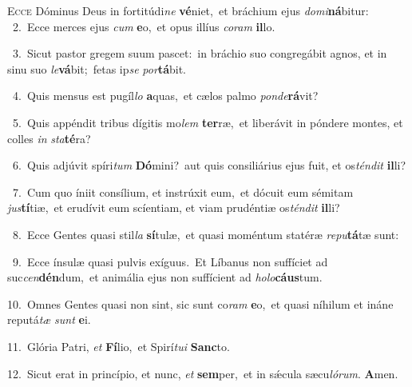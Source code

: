 \lettrine{\initial\textcolor{\initialcolor}{E}}{cce} Dóminus Deus in fortitúdi\textit{ne} \textbf{vé}\-niet,~\star et bráchium ejus \textit{do}\-\textit{mi}\textbf{ná}bitur:\\
{\numbfont\textcolor{\numbcolor}{~2.}}~Ecce merces ejus \textit{cum} \textbf{e}\-o,~\star et opus illíus \textit{co}\-\textit{ram} \textbf{il}\-lo.\par
{\numbfont\textcolor{\numbcolor}{~3.}}~Sicut pastor gregem suum pascet:~\dagger in bráchio suo congregábit agnos, et in sinu suo \textit{le}\-\textbf{vá}bit;~\star fetas ip\textit{se} \textit{por}\-\textbf{tá}bit.\par
{\numbfont\textcolor{\numbcolor}{~4.}}~Quis mensus est pugíl\textit{lo} \textbf{a}\-quas,~\star et cælos palmo \textit{pon}\-\textit{de}\textbf{rá}vit?\par
{\numbfont\textcolor{\numbcolor}{~5.}}~Quis appéndit tribus dígitis mo\textit{lem} \textbf{ter}\-ræ,~\star et liberávit in póndere montes, et colles \textit{in} \textit{sta}\-\textbf{té}ra?\par
{\numbfont\textcolor{\numbcolor}{~6.}}~Quis adjúvit spíri\textit{tum} \textbf{Dó}\-mini?~\star aut quis consiliárius ejus fuit, et os\-\textit{tén}\-\textit{dit} \textbf{il}\-li?\par
{\numbfont\textcolor{\numbcolor}{~7.}}~Cum quo íniit consílium, et instrúxit eum,~\dagger et dócuit eum sémitam \textit{jus}\-\textbf{tí}tiæ,~\star et erudívit eum scíentiam, et viam prudéntiæ os\-\textit{tén}\-\textit{dit} \textbf{il}\-li?\par
{\numbfont\textcolor{\numbcolor}{~8.}}~Ecce Gentes quasi stil\textit{la} \textbf{sí}\-tulæ,~\star et quasi moméntum statéræ \textit{re}\-\textit{pu}\textbf{tá}tæ sunt:\par
{\numbfont\textcolor{\numbcolor}{~9.}}~Ecce ínsulæ quasi pulvis exíguus.~\dagger Et Líbanus non suffíciet ad suc\-\textit{cen}\-\textbf{dén}dum,~\star et animália ejus non suffícient ad \textit{ho}\-\textit{lo}\textbf{cáus}tum.\par
{\numbfont\textcolor{\numbcolor}{10.}}~Omnes Gentes quasi non sint, sic sunt co\textit{ram} \textbf{e}\-o,~\star et quasi níhilum et ináne reputá\textit{tæ} \textit{sunt} \textbf{e}\-i.\par
{\numbfont\textcolor{\numbcolor}{11.}}~Glória Patri, \textit{et} \textbf{Fí}\-lio,~\star et Spirí\-\textit{tu}\-\textit{i} \textbf{Sanc}\-to.\par
{\numbfont\textcolor{\numbcolor}{12.}}~Sicut erat in princípio, et nunc, \textit{et} \textbf{sem}\-per,~\star et in sǽcula sæcu\-\textit{ló}\-\textit{rum}. \textbf{A}\-men.\par
